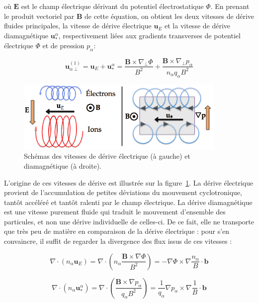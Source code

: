 \begin{refsection}
où $\mathbf E$ est le champ électrique dérivant du potentiel électrostatique
$\Phi$. En prenant le produit vectoriel par $\mathbf B$ de cette équation, on
obtient les deux vitesses de dérive fluides principales, la vitesse de dérive
électrique $\mathbf u_E$ et la vitesse de dérive diamagnétique $\mathbf
u^\alpha_*$, respectivement liées aux gradients transverses de potentiel
électrique $\Phi$ et de pression $p_\alpha$:

\begin{equation}
\label{1-eqVitessesDerive}
\mathbf u_{\alpha\perp}^{(1)}=\mathbf u_E+\mathbf u^\alpha_*=\frac{\mathbf
B\times\nabla_\perp \Phi}{B^2}+\frac{\mathbf B\times\nabla_\perp
p_\alpha}{n_\alpha q_\alpha B^2}
\end{equation}

\begin{figure}[!htbp]
    \centering
	\includegraphics[width=0.9\textwidth]{figures/1-vitessesDerive.png}
	\caption{Schémas des vitesses de dérive électrique (à gauche) et diamagnétique
	(à droite).}
	\label{1-vitessesDerive}
\end{figure}

L'origine de ces vitesses de dérive est illustrée sur la
figure~\ref{1-vitessesDerive}. La dérive électrique provient de l'accumulation
de petites déviations du mouvement cyclotronique, tantôt accéléré et tantôt
ralenti par le champ électrique. La dérive diamagnétique est une vitesse
purement fluide qui traduit le mouvement d'ensemble des particules, et non une
dérive individuelle de celles-ci. De ce fait, elle ne transporte que très peu
de matière en comparaison de la dérive électrique : pour s'en convaincre, il
suffit de regarder la divergence des flux issus de ces vitesses :

\begin{equation}
\nabla\cdot\left(n_\alpha\mathbf
u_E\right)=\nabla\cdot\left(n_\alpha\frac{\mathbf B\times\nabla
\Phi}{B^2}\right) =-\nabla \Phi\times\nabla\frac{n_\alpha}{B}\cdot \mathbf b
\end{equation}

\begin{equation}
\nabla\cdot\left(n_\alpha\mathbf
u^\alpha_*\right)=\nabla\cdot\left(\frac{\mathbf B\times\nabla
p_\alpha}{q_\alpha B^2}\right)
=\frac{1}{q_\alpha}\nabla p_\alpha\times\nabla\frac{1}{B}\cdot \mathbf b
\end{equation}


\end{refsection}
